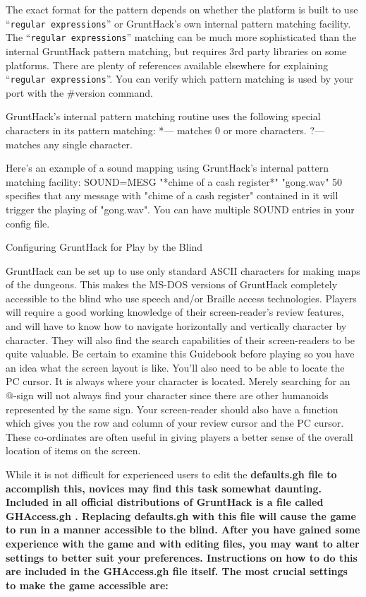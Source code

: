 The exact format for the pattern depends on whether the platform is
built to use ``{\tt regular expressions}'' or GruntHack's own internal pattern 
matching facility. The ``{\tt regular expressions}'' matching can be much more 
sophisticated than the internal GruntHack pattern matching, but requires 
3rd party libraries on some platforms.  There are plenty of references 
available elsewhere for explaining ``{\tt regular expressions}''. You can verify 
which pattern matching is used by your port with the \#version command.  

GruntHack's internal pattern matching routine uses the following
special characters in its pattern matching:
  *--- matches 0 or more characters.
  ?--- matches any single character.

Here's an example of a sound mapping using GruntHack's internal
pattern matching facility:
    SOUND=MESG "*chime of a cash register*" "gong.wav" 50
specifies that any message with "chime of a cash register" contained
in it will trigger the playing of "gong.wav".  You can have multiple
SOUND entries in your config file.

Configuring GruntHack for Play by the Blind

GruntHack can be set up to use only standard ASCII characters for making
maps of the dungeons. This makes the MS-DOS versions of GruntHack completely
accessible to the blind who use speech and/or Braille access technologies.
Players will require a good working knowledge of their screen-reader's
review features, and will have to know how to navigate horizontally and
vertically character by character. They will also find the search
capabilities of their screen-readers to be quite valuable. Be certain to
examine this Guidebook before playing so you have an idea what the screen
layout is like. You'll also need to be able to locate the PC cursor. It is
always where your character is located. Merely searching for an @-sign will
not always find your character since there are other humanoids represented
by the same sign. Your screen-reader should also have a function which
gives you the row and column of your review cursor and the PC cursor.
These co-ordinates are often useful in giving players a better sense of the
overall location of items on the screen.

While it is not difficult for experienced users to edit the %
\bf defaults.gh \rm%
file to accomplish this, novices may find this task somewhat daunting.
Included in all official distributions of GruntHack is a file called
%
\bf GHAccess.gh\rm%
.  Replacing %
\bf defaults.gh \rm%
with this file will cause
the game to run in a manner accessible to the blind. After you have gained
some experience with the game and with editing files, you may want to alter
settings to better suit your preferences. Instructions on how to do this
are included in the %
\bf GHAccess.gh \rm%
file itself. The most crucial settings to
make the game accessible are:

